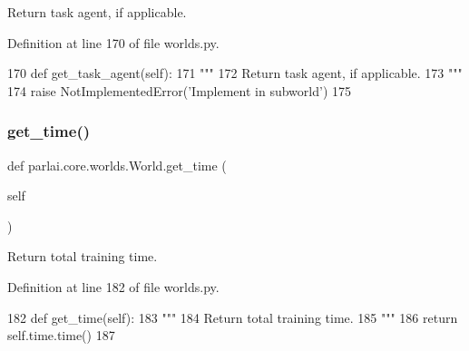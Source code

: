 \begin{DoxyVerb}Return task agent, if applicable.
\end{DoxyVerb}
 

Definition at line 170 of file worlds.\+py.


\begin{DoxyCode}
170     \textcolor{keyword}{def }get\_task\_agent(self):
171         \textcolor{stringliteral}{"""}
172 \textcolor{stringliteral}{        Return task agent, if applicable.}
173 \textcolor{stringliteral}{        """}
174         \textcolor{keywordflow}{raise} NotImplementedError(\textcolor{stringliteral}{'Implement in subworld'})
175 
\end{DoxyCode}
\mbox{\label{classparlai_1_1core_1_1worlds_1_1World_a621ed405ee96d67bc4bab781145a3daa}} 
\subsubsection{\texorpdfstring{get\+\_\+time()}{get\_time()}}
{\footnotesize\ttfamily def parlai.\+core.\+worlds.\+World.\+get\+\_\+time (\begin{DoxyParamCaption}\item[{}]{self }\end{DoxyParamCaption})}

\begin{DoxyVerb}Return total training time.
\end{DoxyVerb}
 

Definition at line 182 of file worlds.\+py.


\begin{DoxyCode}
182     \textcolor{keyword}{def }get\_time(self):
183         \textcolor{stringliteral}{"""}
184 \textcolor{stringliteral}{        Return total training time.}
185 \textcolor{stringliteral}{        """}
186         \textcolor{keywordflow}{return} self.time.time()
187 
\end{DoxyCode}
\mbox{\label{classparlai_1_1core_1_1worlds_1_1World_acf90b0f1a9ec1314b905159559b4d4ab}} 
